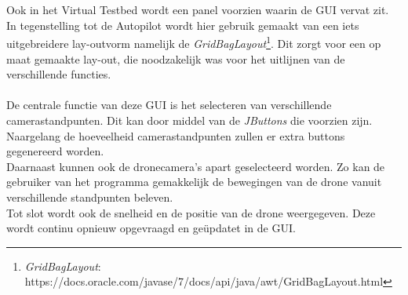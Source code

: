\\
\\
Ook in het Virtual Testbed wordt een panel voorzien waarin de GUI vervat zit. In tegenstelling tot de Autopilot wordt hier gebruik gemaakt van een iets uitgebreidere lay-outvorm namelijk de \textit{GridBagLayout}\footnote{\textit{GridBagLayout}: https://docs.oracle.com/javase/7/docs/api/java/awt/GridBagLayout.html}. Dit zorgt voor een op maat gemaakte lay-out, die noodzakelijk was voor het uitlijnen van de verschillende functies. 
\\
\\
De centrale functie van deze GUI is het selecteren van verschillende camerastandpunten. Dit kan door middel van de \textit{JButtons} die voorzien zijn. Naargelang de hoeveelheid camerastandpunten zullen er extra buttons gegenereerd worden.
\\
Daarnaast kunnen ook de dronecamera's apart geselecteerd worden. Zo kan de gebruiker van het programma gemakkelijk de bewegingen van de drone vanuit verschillende standpunten beleven.  
\\
Tot slot wordt ook de snelheid en de positie van de drone weergegeven. Deze wordt continu opnieuw opgevraagd en ge\"{u}pdatet in de GUI. 